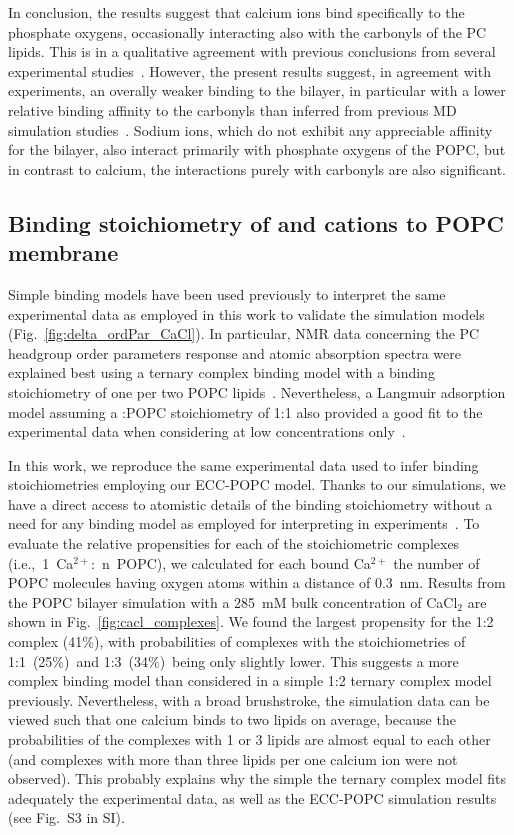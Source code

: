 In conclusion, the results suggest that calcium ions bind specifically to the phosphate oxygens, occasionally interacting also with the carbonyls of the PC lipids. This is in a qualitative agreement with previous conclusions from several experimental studies~\citep{hauser76, hauser78, herbette84, cevc90, binder02}. However, the present results suggest, in 
agreement with experiments, an overally weaker binding to the bilayer, in particular with a lower relative binding affinity to the carbonyls than inferred from previous MD simulation studies~\citep{bockmann03, bockmann04, melcrova16, javanainen17}. Sodium ions, which do not exhibit any appreciable affinity for the bilayer, also interact primarily with phosphate oxygens of the POPC, but in contrast to calcium, the interactions purely with carbonyls are also significant. 
 
 
\subsection{Binding stoichiometry of  and  cations to POPC membrane} 
Simple binding models have been used previously to interpret the same experimental data \citep{altenbach84,macdonald87} as employed in this work to validate the simulation models (Fig.~\ref{fig:delta_ordPar_CaCl}). In particular, NMR data concerning the PC headgroup order parameters response and atomic absorption spectra were explained best using a ternary complex binding model with a binding stoichiometry of one  per two POPC lipids~\citep{altenbach84}. Nevertheless, a Langmuir adsorption model assuming a :POPC stoichiometry of 1:1 also provided a good fit to the experimental data when considering  at low concentrations only~\citep{macdonald87}. 
 
 
In this work, we reproduce the same experimental data used to infer binding stoichiometries employing our ECC-POPC model. Thanks to our simulations, we have a direct access to atomistic details of the binding stoichiometry without a need for any binding model as employed for interpreting in experiments~\citep{altenbach84, macdonald87}.
To evaluate the relative propensities for each of the stoichiometric complexes (i.e.,~1~Ca$^{2+}$:~n~POPC),
we calculated for each bound Ca$^{2+}$ the number of POPC molecules having oxygen atoms within a distance of 0.3~nm.
Results from the POPC bilayer simulation with a 285~mM bulk concentration of CaCl$_2$ are shown in Fig.~\ref{fig:cacl_complexes}. 
We found the largest propensity for the 1:2 complex (41\%), with probabilities of complexes with the stoichiometries of 1:1~(25\%)~and 1:3~(34\%)~being only slightly lower. This suggests a more complex binding model than considered in a simple 1:2 ternary complex model previously. Nevertheless, with a broad brushstroke, the simulation data can be viewed such that one calcium binds to two lipids on average, because the probabilities of the complexes with 1 or 3 lipids are almost equal to each other  (and complexes with more than three lipids per one calcium ion were not observed). This probably explains why the simple the ternary complex model fits adequately the experimental data, as well as the ECC-POPC simulation results (see Fig.~S3 in SI). 
 
